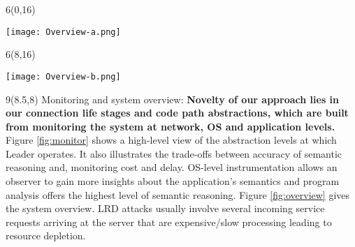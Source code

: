 \documentclass{article}
\def\CHead#1{\begin{center}\noindent{\LARGE\color{DarkBlue} #1}\end{center}}
\renewcommand{\LARGE}{\fontsize{43}{54}\selectfont}
\begin{document}

\begin{textblock}{6}(0,16)
\begin{figure*} 
	\begin{center}
		\texttt{[image: Overview-a.png]}
			\caption{Monitoring at different abstraction levels, with the associated trade-off.  \label{fig:monitor}}
	\end{center}
\end{figure*}
\end{textblock}

\begin{textblock}{6}(8,16)
\begin{figure*} 
	\begin{center}
	   \texttt{[image: Overview-b.png]}
	   	\caption{System overview.  \label{fig:overview}}
	\end{center}
\end{figure*}
\end{textblock}

\begin{textblock}{9}(8.5,8)
Monitoring and system overview: \textbf{Novelty of our approach lies in our connection life stages and code path abstractions, which are built from monitoring the system at network, OS and application levels.} Figure \ref{fig:monitor} shows a high-level view of the abstraction levels at which Leader operates. It also illustrates the trade-offs between accuracy of semantic reasoning and, monitoring cost and delay. OS-level instrumentation allows an observer to gain more insights about the application’s semantics and program analysis offers the highest level of semantic reasoning. Figure \ref{fig:overview} gives the system overview. LRD attacks usually involve several incoming service requests arriving at the server that are expensive/slow processing leading to resource depletion.

\end{textblock}
\end{document}
